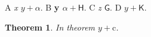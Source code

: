 \documentclass{article}
\newtheorem{thm}{Theorem}
\begin{document}
A \emph{x $y+\alpha$}. B \textbf{y $\alpha+\mathsf{H}$}. C \textit{z $\mathsf{G}$}. D $y+\mathsf{K}$.
\begin{thm} In theorem $y+\mathrm{c}$. \end{thm}
\end{document}
